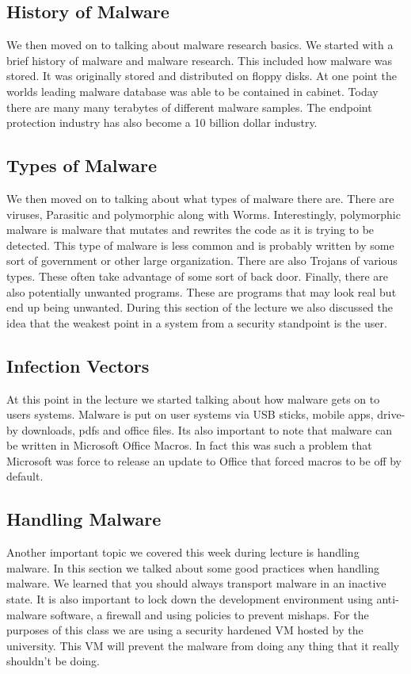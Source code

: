 \documentclass[letterpaper, onecolumn,10pt]{IEEEtran}
\begin{document}
		    \subsection{History of Malware} We then moved on to talking about malware research basics. We started with a brief history of malware and malware research. This included how malware was stored. It was originally stored and distributed on floppy disks. At one point the worlds leading malware database was able to be contained in cabinet. Today there are many many terabytes of different malware samples. The endpoint protection industry has also become a 10 billion dollar industry.\\
		    
		    \subsection{Types of Malware} We then moved on to talking about what types of malware there are. There are viruses, Parasitic and polymorphic along with Worms. Interestingly, polymorphic malware is malware that mutates and rewrites the code as it is trying to be detected. This type of malware is less common and is probably written by some sort of government or other large organization. There are also Trojans of various types. These often take advantage of some sort of back door. Finally, there are also potentially unwanted programs. These are programs that may look real but end up being unwanted. During this section of the lecture we also discussed the idea that the weakest point in a system from a security standpoint is the user.\\
		    
		    \subsection{Infection Vectors} At this point in the lecture we started talking about how malware gets on to users systems. Malware is put on user systems via USB sticks, mobile apps, drive-by downloads, pdfs and office files. Its also important to note that malware can be written in Microsoft Office Macros. In fact this was such a problem that Microsoft was force to release an update to Office that forced macros to be off by default.\\
		    
		    \subsection{Handling Malware} Another important topic we covered this week during lecture is handling malware. In this section we talked about some good practices when handling malware. We learned that you should always transport malware in an inactive state. It is also important to lock down the development environment using anti-malware software, a firewall and using policies to prevent mishaps. For the purposes of this class we are using a security hardened VM hosted by the university. This VM will prevent the malware from doing any thing that it really shouldn't be doing.
		    
\end{document}
